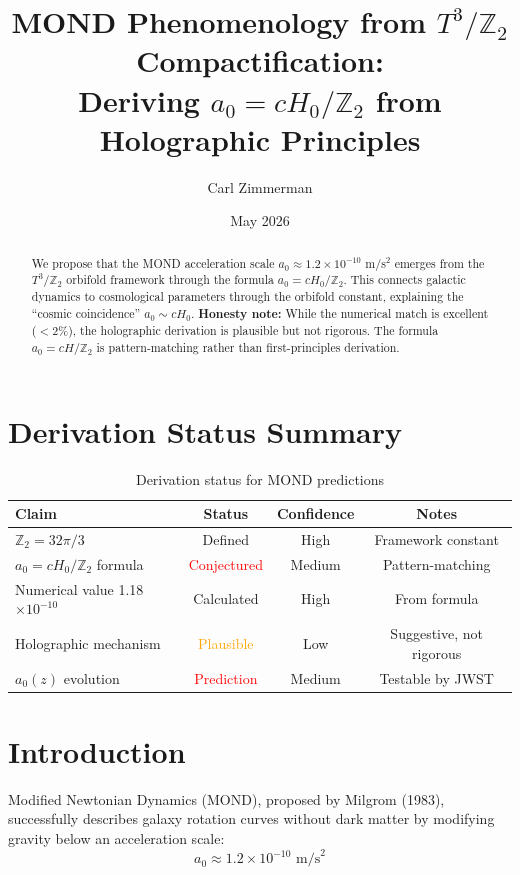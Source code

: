 \documentclass[12pt,a4paper]{article}
\title{MOND Phenomenology from $T^3/\mathbb{Z}_2$ Compactification:\\
Deriving $a_0 = cH_0/\mathbb{Z}_2$ from Holographic Principles}
\author{Carl Zimmerman}
\date{May 2026}
\begin{document}
\maketitle

\begin{abstract}
We propose that the MOND acceleration scale $a_0 \approx 1.2 \times 10^{-10}$ m/s$^2$ emerges from the $T^3/\mathbb{Z}_2$ orbifold framework through the formula $a_0 = cH_0/\mathbb{Z}_2$. This connects galactic dynamics to cosmological parameters through the orbifold constant, explaining the ``cosmic coincidence'' $a_0 \sim cH_0$. \textbf{Honesty note:} While the numerical match is excellent ($<$2\%), the holographic derivation is plausible but not rigorous. The formula $a_0 = cH/\mathbb{Z}_2$ is pattern-matching rather than first-principles derivation.
\end{abstract}

\section{Derivation Status Summary}

\begin{table}[h]
\centering
\begin{tabular}{lccc}
\toprule
Claim & Status & Confidence & Notes \\
\midrule
$\mathbb{Z}_2 = 32\pi/3$ & Defined & High & Framework constant \\
$a_0 = cH_0/\mathbb{Z}_2$ formula & \textcolor{red}{Conjectured} & Medium & Pattern-matching \\
Numerical value 1.18$\times 10^{-10}$ & Calculated & High & From formula \\
Holographic mechanism & \textcolor{orange}{Plausible} & Low & Suggestive, not rigorous \\
$a_0(z)$ evolution & \textcolor{red}{Prediction} & Medium & Testable by JWST \\
\bottomrule
\end{tabular}
\caption{Derivation status for MOND predictions}
\end{table}

\section{Introduction}

Modified Newtonian Dynamics (MOND), proposed by Milgrom (1983), successfully describes galaxy rotation curves without dark matter by modifying gravity below an acceleration scale:
\begin{equation}
a_0 \approx 1.2 \times 10^{-10} \text{ m/s}^2
\end{equation}
\end{document}
